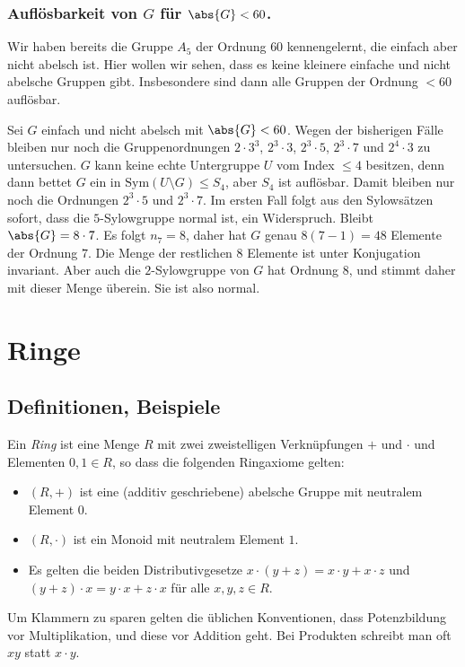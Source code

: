 \documentclass[12pt,a4paper,twoside]{article}
\newcommand{\ei}[1]{\emph{#1}\index{#1}}
\begin{document}
\subsubsection{Aufl\"osbarkeit von $G$ f\"ur $\abs{G}<60$.}
Wir haben bereits die Gruppe $A_5$ der Ordnung $60$ kennengelernt, die einfach
aber nicht abelsch ist. Hier wollen wir sehen, dass es keine kleinere einfache
und nicht abelsche Gruppen gibt. Insbesondere sind dann alle Gruppen der
Ordnung $<60$ aufl\"osbar.

Sei $G$ einfach und nicht abelsch mit $\abs{G}<60$. Wegen der bisherigen
F\"alle bleiben nur noch die Gruppenordnungen $2\cdot 3^3$, $2^3\cdot 3$,
$2^3\cdot 5$, $2^3\cdot 7$ und $2^4\cdot 3$ zu untersuchen. $G$ kann keine
echte Untergruppe $U$ vom Index $\le4$ besitzen, denn dann bettet $G$ ein in
$\text{Sym}(U\setminus G)\le S_4$, aber $S_4$ ist aufl\"osbar. Damit bleiben
nur noch die Ordnungen $2^3\cdot 5$ und $2^3\cdot 7$. Im ersten Fall folgt aus
den Sylows\"atzen sofort, dass die $5$-Sylowgruppe normal ist, ein
Widerspruch. Bleibt $\abs{G}=8\cdot 7$. Es folgt $n_7=8$, daher hat $G$ genau
$8(7-1)=48$ Elemente der Ordnung $7$. Die Menge der restlichen $8$ Elemente
ist unter Konjugation invariant. Aber auch die $2$-Sylowgruppe von $G$ hat
Ordnung $8$, und stimmt daher mit dieser Menge \"uberein. Sie ist also normal.
\section{Ringe}
\subsection{Definitionen, Beispiele}
Ein \ei{Ring} ist eine Menge $R$ mit zwei zweistelligen Verkn\"upfungen $+$
und $\cdot$ und Elementen $0,1\in R$, so dass die folgenden Ringaxiome gelten:
\begin{itemize}
\item $(R,+)$ ist eine (additiv geschriebene) abelsche Gruppe mit neutralem
  Element $0$.
\item $(R,\cdot)$ ist ein Monoid mit neutralem Element $1$.
\item Es gelten die beiden Distributivgesetze $x\cdot(y+z)=x\cdot y+x\cdot z$
  und $(y+z)\cdot x=y\cdot x+z\cdot x$ f\"ur alle $x,y,z\in R$.
\end{itemize}
Um Klammern zu sparen gelten die \"ublichen Konventionen, dass Potenzbildung
vor Multiplikation, und diese vor Addition geht. Bei Produkten schreibt man
oft $xy$ statt $x\cdot y$.
\end{document}
